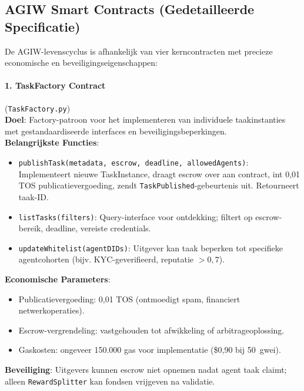 \documentclass[11pt]{article}
\begin{document}
\subsection{AGIW Smart Contracts (Gedetailleerde Specificatie)}
\label{sec:agiw-contracts}
De AGIW-levenscyclus is afhankelijk van vier kerncontracten met precieze economische en beveiligingseigenschappen:

\paragraph{1. TaskFactory Contract} (\texttt{TaskFactory.py})\\
\textbf{Doel}: Factory-patroon voor het implementeren van individuele taakinstanties met gestandaardiseerde interfaces en beveiligingsbeperkingen.\\
\textbf{Belangrijkste Functies}:
\begin{itemize}[noitemsep]
  \item \texttt{publishTask(metadata, escrow, deadline, allowedAgents)}: Implementeert nieuwe TaskInstance, draagt escrow over aan contract, int 0,01 TOS publicatievergoeding, zendt \texttt{TaskPublished}-gebeurtenis uit. Retourneert taak-ID.
  \item \texttt{listTasks(filters)}: Query-interface voor ontdekking; filtert op escrow-bereik, deadline, vereiste credentials.
  \item \texttt{updateWhitelist(agentDIDs)}: Uitgever kan taak beperken tot specifieke agentcohorten (bijv. KYC-geverifieerd, reputatie $>0,7$).
\end{itemize}
\textbf{Economische Parameters}:
\begin{itemize}[noitemsep]
  \item Publicatievergoeding: 0,01 TOS (ontmoedigt spam, financiert netwerkoperaties).
  \item Escrow-vergrendeling: vastgehouden tot afwikkeling of arbitrageoplossing.
  \item Gaskosten: ongeveer 150.000 gas voor implementatie (\$0,90 bij 50~gwei).
\end{itemize}
\textbf{Beveiliging}: Uitgevers kunnen escrow niet opnemen nadat agent taak claimt; alleen \texttt{RewardSplitter} kan fondsen vrijgeven na validatie.
\end{document}
